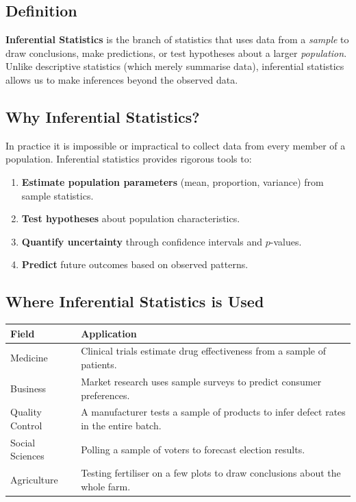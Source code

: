 \documentclass[12pt]{article}
\newcommand{\hcell}[1]{\textbf{\color{white}#1}}
\begin{document}
\subsection*{Definition}

\begin{conceptbox}
\textbf{Inferential Statistics} is the branch of statistics that uses data from a \emph{sample} to draw conclusions, make predictions, or test hypotheses about a larger \emph{population}. Unlike descriptive statistics (which merely summarise data), inferential statistics allows us to make inferences beyond the observed data.
\end{conceptbox}

\subsection*{Why Inferential Statistics?}

In practice it is impossible or impractical to collect data from every member of a population. Inferential statistics provides rigorous tools to:
\begin{enumerate}[noitemsep, topsep=6pt]
  \item \textbf{Estimate population parameters} (mean, proportion, variance) from sample statistics.
  \item \textbf{Test hypotheses} about population characteristics.
  \item \textbf{Quantify uncertainty} through confidence intervals and $p$-values.
  \item \textbf{Predict} future outcomes based on observed patterns.
\end{enumerate}

\subsection*{Where Inferential Statistics is Used}

\begin{center}
\begin{tabular}{p{3.5cm} p{9cm}}
\toprule
\rowcolor{primary}
\hcell{Field} & \hcell{Application} \\
\midrule
\rowcolor{lightbg!40}
Medicine & Clinical trials estimate drug effectiveness from a sample of patients. \\
Business & Market research uses sample surveys to predict consumer preferences. \\
\rowcolor{lightbg!40}
Quality Control & A manufacturer tests a sample of products to infer defect rates in the entire batch. \\
Social Sciences & Polling a sample of voters to forecast election results. \\
\rowcolor{lightbg!40}
Agriculture & Testing fertiliser on a few plots to draw conclusions about the whole farm. \\
\bottomrule
\end{tabular}
\end{center}
\end{document}
